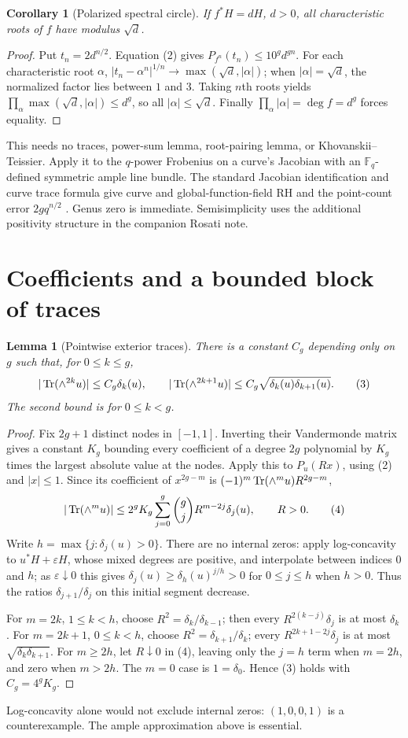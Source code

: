 \documentclass[11pt]{article}
\newtheorem{lemma}[theorem]{Lemma}
\newtheorem{corollary}[theorem]{Corollary}
\begin{document}
\begin{corollary}[Polarized spectral circle]\label{circle}
If $f^*H=dH$, $d>0$, all characteristic roots of $f$ have modulus $\sqrt d$.
\end{corollary}
\begin{proof}
Put $t_n=2d^{n/2}$. Equation (2) gives
$P_{f^n}(t_n)\le10^g d^{gn}$. For each characteristic root $\alpha$,
$|t_n-\alpha^n|^{1/n}\to\max(\sqrt d,|\alpha|)$; when
$|\alpha|=\sqrt d$, the normalized factor lies between $1$ and $3$.
Taking $n$th roots yields
$\prod_\alpha\max(\sqrt d,|\alpha|)\le d^g$, so all
$|\alpha|\le\sqrt d$. Finally $\prod_\alpha|\alpha|=\deg f=d^g$
forces equality.
\end{proof}
This needs no traces, power-sum lemma, root-pairing lemma, or
Khovanskii--Teissier. Apply it to the $q$-power Frobenius on a curve's
Jacobian with an $\mathbb F_q$-defined symmetric ample line bundle.
The standard Jacobian identification and curve trace formula give curve
and global-function-field RH and the point-count error $2gq^{n/2}$
\cite{MilneRH}.
Genus zero is immediate. Semisimplicity uses the additional positivity
structure in the companion Rosati note.

\section{Coefficients and a bounded block of traces}
\begin{lemma}[Pointwise exterior traces]\label{coefficients}
There is a constant $C_g$ depending only on $g$ such that, for $0\le k\le g$,
\[
 |\operatorname{Tr}(\wedge^{2k}u)|\le C_g\delta_k(u),\qquad
 |\operatorname{Tr}(\wedge^{2k+1}u)|\le C_g\sqrt{\delta_k(u)\delta_{k+1}(u)}.
 \tag{3}
\]
The second bound is for $0\le k<g$.
\end{lemma}
\begin{proof}
Fix $2g+1$ distinct nodes in $[-1,1]$. Inverting their Vandermonde
matrix gives a constant $K_g$ bounding every coefficient of a degree
$2g$ polynomial by $K_g$ times the largest absolute value at the nodes.
Apply this to $P_u(Rx)$, using (2) and $|x|\le1$. Since its coefficient
of $x^{2g-m}$ is $(-1)^m\operatorname{Tr}(\wedge^m u)R^{2g-m}$,
\[
 |\operatorname{Tr}(\wedge^m u)|\le
 2^gK_g\sum_{j=0}^g\binom gj R^{m-2j}\delta_j(u),\qquad R>0.
 \tag{4}
\]
Write $h=\max\{j:\delta_j(u)>0\}$. There are no internal zeros:
apply log-concavity to $u^*H+\varepsilon H$, whose mixed degrees are
positive, and interpolate between indices $0$ and $h$; as
$\varepsilon\downarrow0$ this gives
$\delta_j(u)\ge\delta_h(u)^{j/h}>0$ for $0\le j\le h$ when $h>0$.
Thus the ratios $\delta_{j+1}/\delta_j$ on this initial segment decrease.

For $m=2k$, $1\le k<h$, choose $R^2=\delta_k/\delta_{k-1}$;
then every $R^{2(k-j)}\delta_j$ is at most $\delta_k$.
For $m=2k+1$, $0\le k<h$, choose $R^2=\delta_{k+1}/\delta_k$;
every $R^{2k+1-2j}\delta_j$ is at most
$\sqrt{\delta_k\delta_{k+1}}$.
For $m\ge2h$, let $R\downarrow0$ in (4), leaving only the $j=h$
term when $m=2h$, and zero when $m>2h$.
The $m=0$ case is $1=\delta_0$. Hence (3) holds with $C_g=4^gK_g$.
\end{proof}
Log-concavity alone would not exclude internal zeros: $(1,0,0,1)$
is a counterexample. The ample approximation above is essential.
\end{document}
